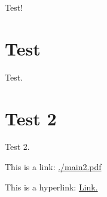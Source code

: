 \documentclass[12pt]{article}
\begin{document}
Test!
\section{Test}
Test.
\section{Test 2}
Test 2.

This is a link: \url{./main2.pdf}

This is a hyperlink: \href{./main2.pdf}{Link.}
\end{document}
